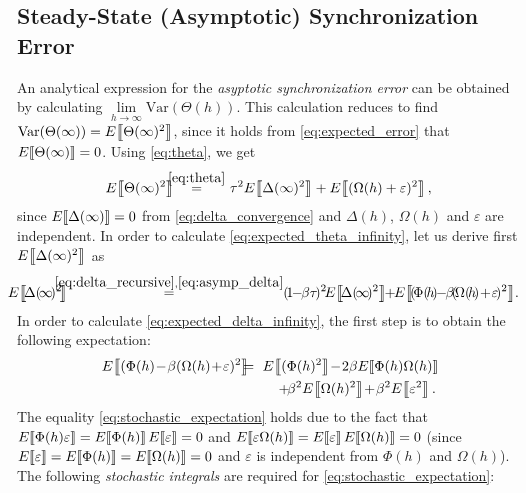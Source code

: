 \subsection{Steady-State (Asymptotic) Synchronization Error}
\label{sec:app_b}
An analytical expression for the \emph{asyptotic 
	synchronization error} can be obtained by calculating 
$\underset{h\rightarrow \infty}{\lim}\mathrm{Var}(\Theta(h))$. This 
calculation reduces to find 
$\mathrm{Var}(\Theta(\infty))=E\!\left\llbracket \Theta(\infty)^2 \right\rrbracket$, since it holds 
from 
\eqref{eq:expected_error} that $E\!\left\llbracket \Theta(\infty) \right\rrbracket=0$. Using 
\eqref{eq:theta}, we 
get
\begin{eqnarray}
\expected{\Theta(\infty)^2} &\!\!\!\!\overset{\eqref{eq:theta}}{=}\!\!\!\!& 
\tau^2\expected{\Delta(\infty)^2}  
+\expected{(\Omega(h)+\varepsilon)^2},\label{eq:expected_theta_infinity}
\end{eqnarray}
since $E\!\left\llbracket \Delta(\infty) \right\rrbracket=0$ from \eqref{eq:delta_convergence} and 
$\Delta(h)$, $\Omega(h)$ and $\varepsilon$ are independent. 
In order to calculate \eqref{eq:expected_theta_infinity}, let us derive first 
$E\!\left\llbracket \Delta(\infty)^2 \right\rrbracket$ as
\begin{eqnarray}
\!\!\!\!\!\expected{\!\Delta(\!\infty\!)^2\!} 
&\!\!\!\!\!\!\!\overset{\eqref{eq:delta_recursive},\eqref{eq:asymp_delta}}{=}\!\!\!\!\!\!& 
(\!1\!\!-\!\!\beta\tau\!)^2\!	
\expected{\!\Delta(\!\infty\!)^2}  
\!\!+\!\!\expected{\!(\!\Phi(\!h\!)\!\!-\!\!\beta\!(\!\Omega(\!h\!)\!+\!\varepsilon\!)^2}\!. 
\label{eq:expected_delta_infinity}
\end{eqnarray}
In order to calculate \eqref{eq:expected_delta_infinity}, the first step is to 
obtain the following expectation:
\begin{eqnarray}
\expected{(\Phi(h)\!-\!\beta(\Omega(h)\!+\!\varepsilon)^2} 
&\!\!\!\!=\!\!\!\!&
\expected{(\Phi(h)^2}
\!-\!2\beta\expected{\Phi(h)\Omega(h)} 
\! \nonumber \\ 
& & +\!\beta^2\expected{\Omega(h)^2}\!+\!\beta^2\expected{\varepsilon^2}. 
\label{eq:stochastic_expectation}
\end{eqnarray}
The equality \eqref{eq:stochastic_expectation} holds due to the fact that 
$E\!\left\llbracket \Phi(h)\varepsilon \right\rrbracket=E\!\left\llbracket \Phi(h) \right\rrbracket E\!\left\llbracket \varepsilon \right\rrbracket=0$ and 
$E\!\left\llbracket \varepsilon\Omega(h) \right\rrbracket=E\!\left\llbracket \varepsilon \right\rrbracket E\!\left\llbracket \Omega(h) \right\rrbracket=0$ 
(since 
$E\!\left\llbracket \varepsilon \right\rrbracket=E\!\left\llbracket \Phi(h) \right\rrbracket=E\!\left\llbracket \Omega(h) \right\rrbracket=0$ and 
$\varepsilon$ is independent from $\Phi(h)$ and $\Omega(h)$). The
following \emph{stochastic integrals} are required for 
\eqref{eq:stochastic_expectation}:
